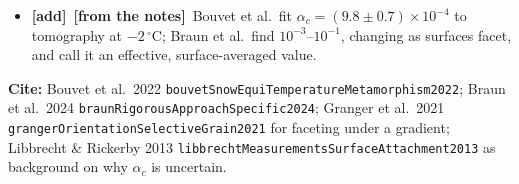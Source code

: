 \documentclass[11pt]{article}
\newcommand{\Note}{\textcolor{open}{\textbf{[from the notes]}}\ }
\newcommand{\Cite}[1]{\par{\footnotesize\raggedright\textcolor{have}{\textbf{Cite:}} #1\par}}
\newcommand{\tA}{\textcolor{have}{\textbf{[add]}}\ }
\begin{document}
\begin{enumerate}
\begin{itemize}
    saturation falls with it (0.29 at $10^{-3}$, 0.25 at $10^{-2}$, 0.18
    at 0.1). One value cannot serve both.
  \item \tA \Note Bouvet et al.\ fit $\alpha_c = (9.8 \pm 0.7)\times10^{-4}$
    to tomography at $-2\,^{\circ}$C; Braun et al.\ find
    $10^{-3}$--$10^{-1}$, changing as surfaces facet, and call it an
    effective, surface-averaged value.
  \end{itemize}
  \Cite{Bouvet et al.\ 2022 \texttt{bouvetSnowEquiTemperatureMetamorphism2022}; Braun et al.\ 2024 \texttt{braunRigorousApproachSpecific2024}; Granger et al.\ 2021 \texttt{grangerOrientationSelectiveGrain2021} for faceting under a gradient; Libbrecht \& Rickerby 2013 \texttt{libbrechtMeasurements\allowbreak SurfaceAttachment2013} as background on why $\alpha_c$ is uncertain.}
\end{enumerate}
\end{document}
